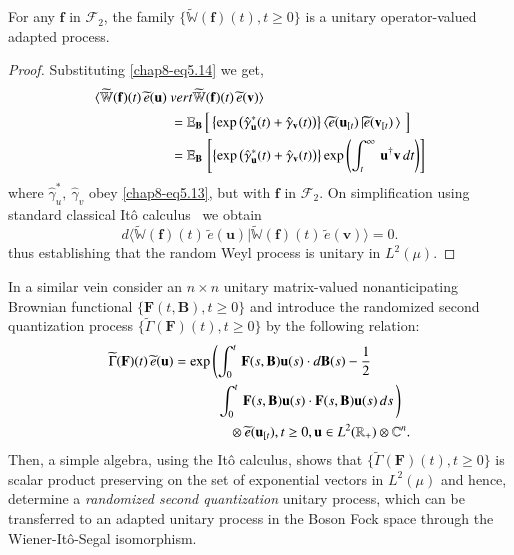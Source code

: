 \begin{thm}\label{chap8-thm1}
For any $\mathbf{f}$ in $\mathcal{F}_2$, the family  
$\{\widetilde{\mathbb{W}}(\mathbf{f})(t), t\geq 0\}$ is  a unitary operator-valued adapted process.
\end{thm}
\begin{proof}
Substituting \eqref{chap8-eq5.14} we get,  
\eject
\begin{align}
\langle \widetilde{\mathbb{W}}(\mathbf{f})(t)\, \widetilde{e}(\mathbf{u})\ & vert \widetilde{\mathbb{W}}
(\mathbf{f})(t)\, \widetilde{e}(\mathbf{v})\rangle\notag\\ 
& = \mathbb{E}_{\mathbf{B}}\, \Big[ \left\{{\exp}\left({\hat{\gamma}_\mathbf{u}^*(t)}+{\hat{\gamma}_\mathbf{v}(t)}\right) \right\}
\langle \widetilde{e}(\mathbf{u}_{[t})\,\vert  \widetilde{e}(\mathbf{v}_{[t})\,\rangle\, \, \Big] \nonumber \\
&=\mathbb{E}_{\mathbf{B}}\, \left[   \left\{{\rm exp}\left({\hat{\gamma}_\mathbf{u}^*(t)}
+{\hat{\gamma}_\mathbf{v}(t)}\right) \right\} {\rm exp}\left(\int_t^\infty\, \mathbf{u}^\dag\mathbf{v}\, dt\right)\right]
\end{align}
where $\hat{\gamma}_u^*,\ \hat{\gamma}_v$ obey \eqref{chap8-eq5.13}, but with  $\mathbf{f}$ in $\mathcal{F}_2$.  On simplification using standard classical It{\^o} calculus~\cite{chap8-key38} we obtain  
\begin{equation}
d\langle \widetilde{\mathbb{W}}(\mathbf{f})(t)\, \widetilde{e}(\mathbf{u})\vert \widetilde{\mathbb{W}}
(\mathbf{f})(t)\, \widetilde{e}(\mathbf{v})\rangle= 0.\label{chap8-eq5.16}
\end{equation}
thus establishing that the random Weyl process is unitary in $L^2(\mu)$.
\end{proof}

In a similar vein  consider an $n\times n$ unitary matrix-valued nonanticipating Brownian functional $\{\mathbf{F}(t,\mathbf{B}), t\geq 0\}$ and introduce the randomized second quantization process $\{\widetilde{\Gamma}(\mathbf{F})(t), t\geq 0\}$ by the following relation: 
\begin{align}
\widetilde{\Gamma}(\mathbf{F})(t)\,  \widetilde{e}(\mathbf{u}) &= {\exp}\left(\int_0^t\, \mathbf{F}(s,\mathbf{B})\mathbf{u}(s)\cdot d\mathbf{B}(s) - \frac{1}{2}\,\right. \notag \\ 
& \qquad \quad \left. \int_0^t\, \mathbf{F}(s,\mathbf{B})\mathbf{u}(s) \cdot \mathbf{F}(s,\mathbf{B})\mathbf{u}(s)\, ds\,\right)\notag \\ 
& \qquad \qquad\otimes \widetilde{e}(\mathbf{u}_{[t}), t\geq 0, \mathbf{u}\in L^2(\mathbb{R}_+)\otimes \mathbb{C}^n.  \label{chap8-eq5.17}
\end{align}
Then, a simple algebra, using the It{\^o} calculus, shows that $\{\widetilde{\Gamma}(\mathbf{F})(t), t\geq 0\}$ is scalar product preserving on the set of exponential vectors in $L^2(\mu)$ and hence, determine a {\em randomized second quantization} unitary process, which can be transferred to an adapted unitary process in the Boson Fock space through the Wiener-It{\^o}-Segal isomorphism. 

